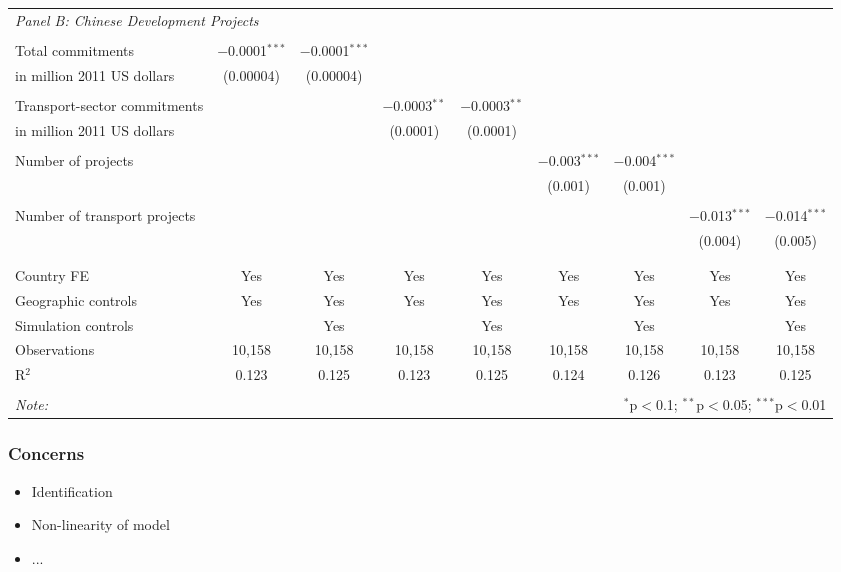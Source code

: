 \documentclass[]{beamer}   	%
\begin{document}
\begin{frame}
\begin{table}[t]
{\begin{tabular}{@{\extracolsep{5pt}}lcccccccc}
\multicolumn{9}{l}{\textit{Panel B: Chinese Development Projects}} \\
\\[-1.8ex]
Total commitments & $-$0.0001$^{***}$ & $-$0.0001$^{***}$ &  &  &  &  &  &  \\
 \hspace*{3mm} in million 2011 US dollars & (0.00004) & (0.00004) &  &  &  &  &  &  \\
 & & & & & & & & \\
Transport-sector commitments &  &  & $-$0.0003$^{**}$ & $-$0.0003$^{**}$ &  &  &  &  \\
 \hspace*{3mm} in million 2011 US dollars &  &  & (0.0001) & (0.0001) &  &  &  &  \\
 & & & & & & & & \\
Number of projects &  &  &  &  & $-$0.003$^{***}$ & $-$0.004$^{***}$ &  &  \\
 &  &  &  &  & (0.001) & (0.001) &  &  \\
 & & & & & & & & \\
Number of transport projects &  &  &  &  &  &  & $-$0.013$^{***}$ & $-$0.014$^{***}$ \\
 &  &  &  &  &  &  & (0.004) & (0.005) \\
 & & & & & & & & \\
 \\[-1.8ex]
Country FE & Yes & Yes & Yes & Yes & Yes & Yes & Yes & Yes \\
Geographic controls & Yes & Yes & Yes & Yes & Yes & Yes & Yes & Yes \\
Simulation controls &  & Yes &  & Yes &  & Yes &  & Yes \\
Observations & 10,158 & 10,158 & 10,158 & 10,158 & 10,158 & 10,158 & 10,158 & 10,158 \\
R$^{2}$ & 0.123 & 0.125 & 0.123 & 0.125 & 0.124 & 0.126 & 0.123 & 0.125 \\
 \hline
 \hline \\[-1.8ex]
 \textit{Note:}  & \multicolumn{8}{r}{$^{*}$p$<$0.1; $^{**}$p$<$0.05; $^{***}$p$<$0.01} \\
 \end{tabular}

}

\end{table}
\end{frame}



\begin{frame}
  \frametitle{Concerns}
  \begin{itemize}
    \item Identification
    \item Non-linearity of model
    \item ...
  \end{itemize}
\end{frame}
\end{document}

